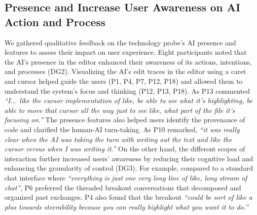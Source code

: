 \subsection{Presence and  Increase User Awareness on AI Action and Process}
\label{Results:presence_context}
We gathered qualitative feedback on the \sys{} technology probe's AI presence and  features to assess their impact on user experience. 
Eight participants noted that the AI's presence in the editor enhanced their awareness of its actions, intentions, and processes (DG2).
Visualizing the AI's edit traces in the editor using a caret and cursor helped guide the users (P1, P4, P7, P12, P18) and allowed them to understand the system's focus and thinking (P12, P13, P18).
As P13 commented \textit{``I... like the cursor implementation of like, be able to see what it's highlighting, be able to move that cursor all the way just to see like, what part of the file it's focusing on.''}
The presence features also helped users identify the provenance of code and clarified the human-AI turn-taking.
As P10 remarked, \textit{``it was really clear when the AI was taking the turn with writing out the text and like the cursor versus when I was writing it.''}
On the other hand, the different scopes of interaction further increased users' awareness by reducing their cognitive load and enhancing the granularity of control (DG3).
For example, compared to a standard chat interface where \textit{``everything is just one very long line of like, long stream of chat''}, P6 preferred the threaded breakout conversations that decomposed and organized past exchanges.
P4 also found that the breakout \textit{``could be sort of like a plus towards steerability because you can really highlight what you want it to do.''}


